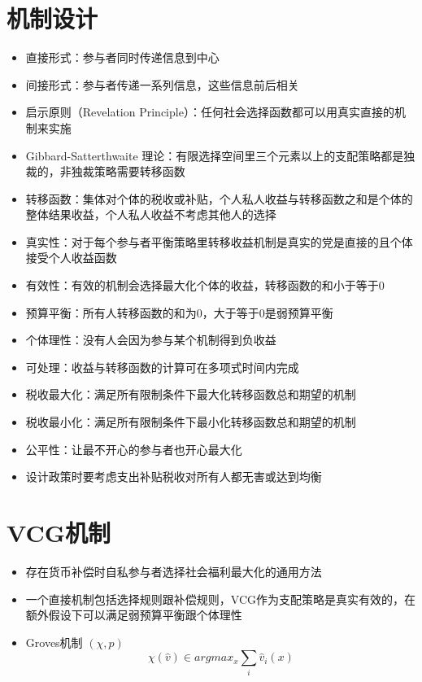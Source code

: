 \documentclass[]{book}
\providecommand{\tightlist}{%
  \setlength{\itemsep}{0pt}\setlength{\parskip}{0pt}}
\begin{document}
\section{机制设计}

\begin{itemize}
\tightlist
\item
  直接形式：参与者同时传递信息到中心
\item
  间接形式：参与者传递一系列信息，这些信息前后相关
\item
  启示原则（Revelation Principle）：任何社会选择函数都可以用真实直接的机制来实施
\item
  Gibbard-Satterthwaite 理论：有限选择空间里三个元素以上的支配策略都是独裁的，非独裁策略需要转移函数
\item
  转移函数：集体对个体的税收或补贴，个人私人收益与转移函数之和是个体的整体结果收益，个人私人收益不考虑其他人的选择
\item
  真实性：对于每个参与者平衡策略里转移收益机制是真实的党是直接的且个体接受个人收益函数
\item
  有效性：有效的机制会选择最大化个体的收益，转移函数的和小于等于0
\item
  预算平衡：所有人转移函数的和为0，大于等于0是弱预算平衡
\item
  个体理性：没有人会因为参与某个机制得到负收益
\item
  可处理：收益与转移函数的计算可在多项式时间内完成
\item
  税收最大化：满足所有限制条件下最大化转移函数总和期望的机制
\item
  税收最小化：满足所有限制条件下最小化转移函数总和期望的机制
\item
  公平性：让最不开心的参与者也开心最大化
\item
  设计政策时要考虑支出补贴税收对所有人都无害或达到均衡
\end{itemize}

\hypertarget{vcg}{%
\section{VCG机制}\label{vcg}}

\begin{itemize}
\tightlist
\item
  存在货币补偿时自私参与者选择社会福利最大化的通用方法
\item
  一个直接机制包括选择规则跟补偿规则，VCG作为支配策略是真实有效的，在额外假设下可以满足弱预算平衡跟个体理性
\item
  Groves机制 \((\chi,p)\)
  \[\chi (\hat v) \in arg max_x \sum_i \hat v_i(x)\]
\end{itemize}
\end{document}
